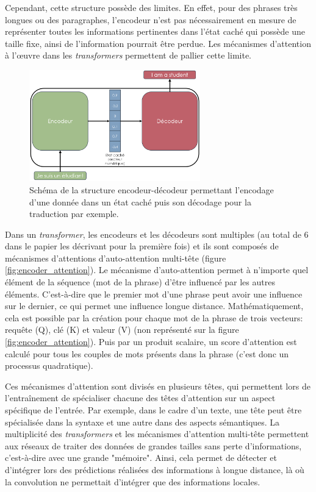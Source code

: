 Cependant, cette structure possède des limites. En effet, pour des phrases très longues ou des paragraphes, l'encodeur n'est pas nécessairement en mesure de représenter toutes les informations pertinentes dans l'état caché qui possède une taille fixe, ainsi de l'information pourrait être perdue. Les mécanismes d'attention à l'œuvre dans les \textit{transformers} permettent de pallier cette limite.
\begin{figure}[!ht]
 \centering
 \includegraphics[width=0.66\textwidth]{figures/encoder_decoder.png}
 \caption[Schéma de la structure encodeur-décodeur]{Schéma de la structure encodeur-décodeur permettant l'encodage d'une donnée dans un état caché puis son décodage pour la traduction par exemple. }
 \label{fig:encoder_decoder}
\end{figure}

Dans un \textit{transformer}, les encodeurs et les décodeurs sont multiples (au total de 6 dans le papier les décrivant pour la première fois) et ils sont composés de mécanismes d'attentions d'auto-attention multi-tête (figure \ref{fig:encoder_attention}). Le mécanisme d'auto-attention permet à n'importe quel élément de la séquence (mot de la phrase) d'être influencé par les autres éléments. C'est-à-dire que le premier mot d'une phrase peut avoir une influence sur le dernier, ce qui permet une influence longue distance. Mathématiquement, cela est possible par la création pour chaque mot de la phrase de trois vecteurs: requête (Q), clé (K) et valeur (V) (non représenté sur la figure \ref{fig:encoder_attention}). Puis par un produit scalaire, un score d'attention est calculé pour tous les couples de mots présents dans la phrase (c'est donc un processus quadratique).


Ces mécanismes d'attention sont divisés en plusieurs têtes, qui permettent lors de l'entraînement de spécialiser chacune des têtes d'attention sur un aspect spécifique de l'entrée. Par exemple, dans le cadre d'un texte, une tête peut être spécialisée dans la syntaxe et une autre dans des aspects sémantiques. 
La multiplicité des \textit{transformers} et les mécanismes d'attention multi-tête permettent aux réseaux de traiter des données de grandes tailles sans perte d'informations, c'est-à-dire avec une grande "mémoire". Ainsi, cela permet de détecter et d'intégrer lors des prédictions réalisées des informations à longue distance, là où la convolution ne permettait d'intégrer que des informations locales.

